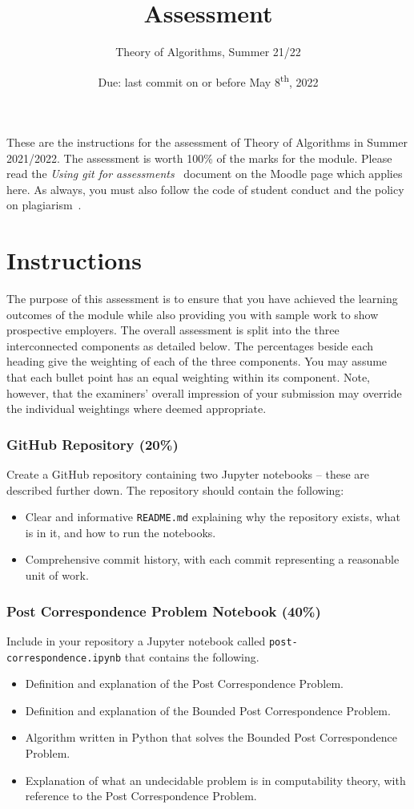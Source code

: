 \documentclass[a4paper, 12pt]{scrartcl}
\title{\vspace{-20mm}Assessment}
\author{Theory of Algorithms, Summer 21/22}
\date{Due: last commit on or before May 8\textsuperscript{th}, 2022\vspace{-6mm}}
\begin{document}
  
  \maketitle

  These are the instructions for the assessment of Theory of Algorithms in Summer 2021/2022.
  The assessment is worth 100\% of the marks for the module.
  Please read the \emph{Using git for assessments}~\cite{usinggit} document on the Moodle page which applies here.
  As always, you must also follow the code of student conduct and the policy on plagiarism~\cite{gmitqaf}.

  \section*{Instructions}
  
  The purpose of this assessment is to ensure that you have achieved the learning outcomes of the module while also providing you with sample work to show prospective employers.
  The overall assessment is split into the three interconnected components as detailed below.
  The percentages beside each heading give the weighting of each of the three components.
  You may assume that each bullet point has an equal weighting within its component.
  Note, however, that the examiners' overall impression of your submission may override the individual weightings where deemed appropriate.

  \subsubsection*{GitHub Repository (20\%)}
  Create a GitHub repository containing two Jupyter notebooks -- these are described further down.
  The repository should contain the following:
  \begin{itemize}
    \item Clear and informative \texttt{README.md} explaining why the repository exists, what is in it, and how to run the notebooks.
    \item Comprehensive commit history, with each commit representing a reasonable unit of work.
  \end{itemize}

  \subsubsection*{Post Correspondence Problem Notebook (40\%)}
  Include in your repository a Jupyter notebook called \texttt{post-correspondence.ipynb} that contains the following.
  \begin{itemize}
    \item Definition and explanation of the Post Correspondence Problem.
    \item Definition and explanation of the Bounded Post Correspondence Problem.
    \item Algorithm written in Python that solves the Bounded Post Correspondence Problem.
    \item Explanation of what an undecidable problem is in computability theory, with reference to the Post Correspondence Problem.
  \end{itemize}
  
\end{document}
